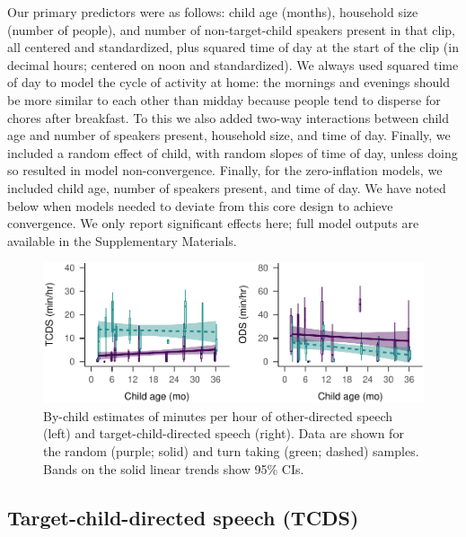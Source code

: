 \documentclass[floatsintext,man]{apa6}
\theoremstyle{definition}
\theoremstyle{definition}
\theoremstyle{definition}
\theoremstyle{remark}
\begin{document}
Our primary predictors were as follows: child age (months), household
size (number of people), and number of non-target-child speakers present
in that clip, all centered and standardized, plus squared time of day at
the start of the clip (in decimal hours; centered on noon and
standardized). We always used squared time of day to model the cycle of
activity at home: the mornings and evenings should be more similar to
each other than midday because people tend to disperse for chores after
breakfast. To this we also added two-way interactions between child age
and number of speakers present, household size, and time of day.
Finally, we included a random effect of child, with random slopes of
time of day, unless doing so resulted in model non-convergence. Finally,
for the zero-inflation models, we included child age, number of speakers
present, and time of day. We have noted below when models needed to
deviate from this core design to achieve convergence. We only report
significant effects here; full model outputs are available in the
Supplementary Materials.

\begin{figure}
\centering
\includegraphics{Tseltal-CLE_files/figure-latex/fig3-1.pdf}
\caption{\label{fig:fig3}By-child estimates of minutes per hour of
other-directed speech (left) and target-child-directed speech (right).
Data are shown for the random (purple; solid) and turn taking (green;
dashed) samples. Bands on the solid linear trends show 95\% CIs.}
\end{figure}

\subsection{Target-child-directed speech
(TCDS)}\label{target-child-directed-speech-tcds}
\end{document}
